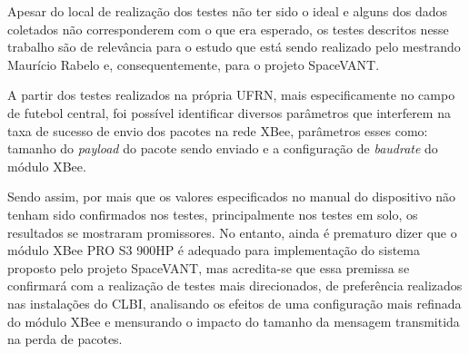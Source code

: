 \label{Cap:conclusao}

Apesar do local de realização dos testes não ter sido o ideal e alguns dos dados coletados não corresponderem com o que era esperado, os testes descritos nesse trabalho são de relevância para o estudo que está sendo realizado pelo mestrando Maurício Rabelo e, consequentemente, para o projeto SpaceVANT.

A partir dos testes realizados na própria UFRN, mais especificamente no campo de futebol central, foi possível identificar diversos parâmetros que interferem na taxa de sucesso de envio dos pacotes na rede XBee, parâmetros esses como: tamanho do \emph{payload} do pacote sendo enviado e a configuração de \emph{baudrate} do módulo XBee.

Sendo assim, por mais que os valores especificados no manual do dispositivo não tenham sido confirmados nos testes, principalmente nos testes em solo, os resultados se mostraram promissores. No entanto, ainda é prematuro dizer que o módulo XBee PRO S3 900HP é adequado para implementação do sistema proposto pelo projeto SpaceVANT, mas acredita-se que essa premissa se confirmará com a realização de testes mais direcionados, de preferência realizados nas instalações do CLBI, analisando os efeitos de uma configuração mais refinada do módulo XBee e mensurando o impacto do tamanho da mensagem transmitida na perda de pacotes.     

 
